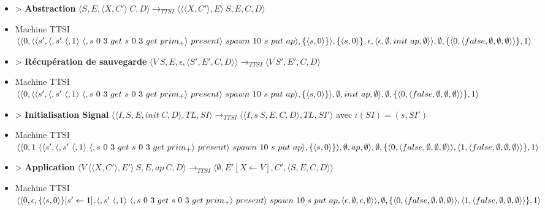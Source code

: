 \documentclass[10pt,a4paper]{report}
\begin{document}
\begin{itemize}
 				\item[] > \textbf{Abstraction} $\langle S,E,\langle X,C'\rangle~C,D\rangle
 				\longrightarrow_{TTSI} 
 				\langle \langle\langle X,C'\rangle,E\rangle~S,E,C,D\rangle$
 				\item[] Machine TTSI $\langle\langle 0,\langle\langle s', \langle, s'~\langle,1\rangle~\langle,s~0~3~get~s~0~3~get~prim_{+}\rangle~present\rangle~spawn~10~s~put~ap\rangle,\{\langle s,0\rangle\}\rangle,\{\langle s,0\rangle\},\epsilon,\\\langle\epsilon,\emptyset,init~ap,\emptyset\rangle\rangle,\emptyset,\{\langle 0,\langle false,\emptyset,\emptyset,\emptyset\rangle\rangle\},1\rangle$
 				\item[] > \textbf{Récupération de sauvegarde} $\langle V~S,E,\epsilon,\langle S',E',C,D\rangle\rangle
 				\longrightarrow_{TTSI} 
 				\langle V~S',E',C,D\rangle$
 				\item[] Machine TTSI $\langle\langle 0,\langle\langle s', \langle, s'~\langle,1\rangle~\langle,s~0~3~get~s~0~3~get~prim_{+}\rangle~present\rangle~spawn~10~s~put~ap\rangle,\{\langle s,0\rangle\}\rangle,\emptyset,init~ap,\emptyset\rangle\\,\emptyset,\{\langle 0,\langle false,\emptyset,\emptyset,\emptyset\rangle\rangle\},1\rangle$
 				\item[] > \textbf{Initialisation Signal} $\langle\langle I,S,E,init~C,D\rangle,TL,SI\rangle 
 				\longrightarrow_{TTSI}
 				\langle\langle I,s~S,E,C,D\rangle,TL,SI'\rangle$
 				avec $\iota(SI) = (s,SI')$
 				\item[] Machine TTSI $\langle\langle 0, 1~\langle\langle s', \langle, s'~\langle,1\rangle~\langle,s~0~3~get~s~0~3~get~prim_{+}\rangle~present\rangle~spawn~10~s~put~ap\rangle,\{\langle s,0\rangle\}\rangle,\emptyset,ap,\emptyset\rangle\\,\emptyset,\{\langle 0,\langle false,\emptyset,\emptyset,\emptyset\rangle\rangle,\langle 1,\langle false,\emptyset,\emptyset,\emptyset\rangle\rangle\},1\rangle$
 				\item[] > \textbf{Application} $\langle V~\langle\langle X,C'\rangle,E'\rangle~S,E,ap~C,D\rangle
 				\longrightarrow_{TTSI} 
 				\langle \emptyset,E'[X \leftarrow V],C',\langle S,E,C,D\rangle\rangle$
 				\item[] Machine TTSI $\langle\langle 0, \epsilon ,\{\langle s,0\rangle\}[s' \leftarrow 1],\langle, s'~\langle,1\rangle~\langle,s~0~3~get~s~0~3~get~prim_{+}\rangle~present\rangle~spawn~10~s~put~ap,\langle\epsilon,\emptyset,\epsilon,\emptyset\rangle\rangle\\,\emptyset,\{\langle 0,\langle false,\emptyset,\emptyset,\emptyset\rangle\rangle,\langle 1,\langle false,\emptyset,\emptyset,\emptyset\rangle\rangle\},1\rangle$

\end{itemize}
\end{document}
